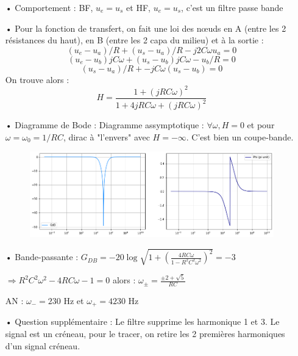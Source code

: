 \documentclass{report}
\begin{document}
\begin{itemize}
	\item[•] Comportement : BF, $u_e=u_s$ et HF, $u_e=u_s$, c'est un filtre passe bande
	
	\item[•]
		Pour la fonction de transfert, on fait une loi des nœuds en A (entre les 2 résistances du haut), en B (entre les 2 capa du milieu) et à la sortie :
	\begin{equation}
		(u_e-u_a)/R+(u_s-u_a)/R-j2C\omega u_a=0
	\end{equation}
	\begin{equation}
		(u_e-u_b)jC\omega+(u_s-u_b)jC\omega-u_b/R=0
	\end{equation}
	\begin{equation}
		(u_s-u_a)/R+-jC\omega(u_s-u_b)=0
	\end{equation}
	On trouve alors :
	\begin{equation}
		H =\frac{1+(jRC\omega)^2}{1+4jRC\omega + (jRC\omega)^2}
	\end{equation}
	
	\item[•]
	Diagramme de Bode :
Diagramme assymptotique :  $\forall \omega, H=0$ et pour $\omega=\omega_0=1/RC$, dirac à "l'envers" avec $H=-\infty$. C'est bien un coupe-bande.
\begin{figure}[!h]
	\centering
	\includegraphics[width=0.8\linewidth]{exo3_0.png}
\end{figure}


	\item[•] Bande-passante :
	$G_{DB} = -20\log \sqrt{1+\left( \frac{4RC\omega}{1-R^2C^2\omega^2}\right) ^2}=-3$ 
	
	$\Rightarrow R^2C^2\omega^2 - 4RC\omega -1=0$
	alors : $\omega_{\pm}=\frac{\pm 2+\sqrt{5}}{RC}$
	
	AN : $\omega_- = 230$ Hz et $\omega_+ = 4230$ Hz
	
	\item[•] Question supplémentaire : 
	Le filtre supprime les harmonique 1 et 3. Le signal est un créneau, pour le tracer, on retire les 2 premières harmoniques d'un signal créneau.
\end{itemize}
\end{document}
